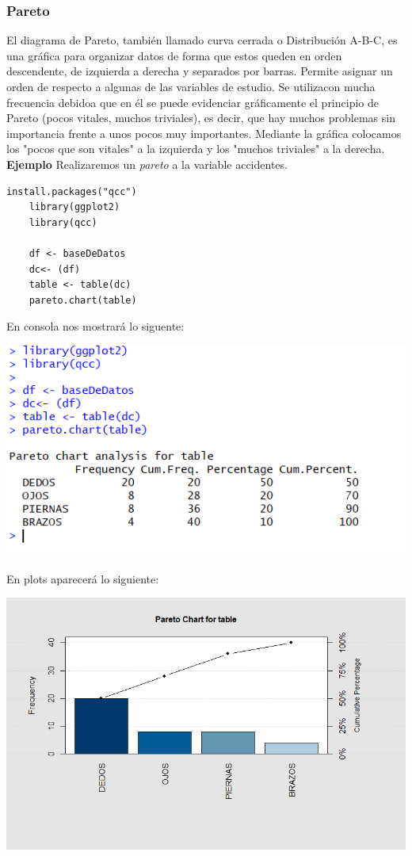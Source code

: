 \documentclass[12pt,hidelinks]{article}
\begin{document}
	\subsubsection{Pareto}
	El diagrama de Pareto, también llamado curva cerrada o Distribución A-B-C, es una gráfica para organizar datos de forma que estos queden en orden descendente, de izquierda a derecha y separados por barras. Permite asignar un orden de respecto a algunas de las variables de estudio. Se utilizacon mucha frecuencia debidoa que en él se puede evidenciar gráficamente el principio de Pareto (pocos vitales, muchos triviales), es decir, que hay muchos problemas sin importancia frente a unos pocos muy importantes. Mediante la gráfica colocamos los "pocos que son vitales" a la izquierda y los "muchos triviales" a la derecha. \textbf{Ejemplo} Realizaremos un \textit{pareto} a la variable accidentes.
	\begin{lstlisting}[frame=single]
	install.packages("qcc")
	library(ggplot2)
	library(qcc)
	
	df <- baseDeDatos
	dc<- (df)
	table <- table(dc)
	pareto.chart(table)
	\end{lstlisting}
	En consola nos mostrará lo siguente:
	\begin{center}
		\includegraphics[]{imgPareto.PNG}
	\end{center}
	En plots aparecerá lo siguiente:
	\begin{center}
		\includegraphics[width = 15cm]{Gpareto.png}
	\end{center}
\end{document}
